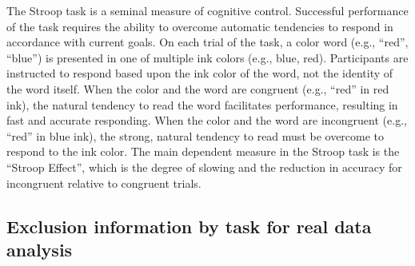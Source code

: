 \documentclass[titlepage,12pt] {article}
\begin{document}
The Stroop task is a seminal measure of cognitive control. Successful performance of the task requires the ability to overcome automatic tendencies to respond in accordance with current goals. On each trial of the task, a color word (e.g., ``red'', ``blue'') is presented in one of multiple ink colors (e.g., blue, red). Participants are instructed to respond based upon the ink color of the word, not the identity of the word itself. When the color and the word are congruent (e.g., “red” in red ink), the natural tendency to read the word facilitates performance, resulting in fast and accurate responding. When the color and the word are incongruent (e.g., ``red'' in blue ink), the strong, natural tendency to read must be overcome to respond to the ink color. The main dependent measure in the Stroop task is the ``Stroop Effect'', which is the degree of slowing and the reduction in accuracy for incongruent relative to congruent trials.



\subsection*{Exclusion information by task for real data analysis}
\end{document}
